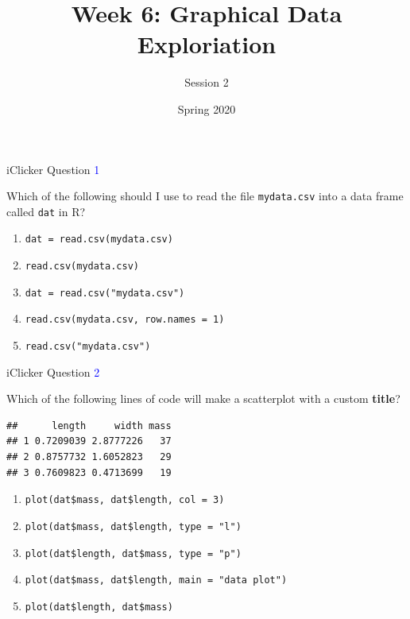 \documentclass[ignorenonframetext,t]{beamer}
\title{Week 6: Graphical Data Exploriation}
\subtitle{Session 2}
\date{Spring 2020}
\begin{document}
\frame{\titlepage}

\begin{frame}[fragile]{iClicker Question \textcolor{blue}{1}}

Which of the following should I use to read the file \texttt{mydata.csv}
into a data frame called \texttt{dat} in R?

\begin{enumerate}[A]
\item \texttt{dat = read.csv(mydata.csv)}
\item \texttt{read.csv(mydata.csv)}
\item \texttt{dat = read.csv("mydata.csv")}
\item \texttt{read.csv(mydata.csv, row.names = 1)}
\item \texttt{read.csv("mydata.csv")}
\end{enumerate}

\vfill


\end{frame}

\begin{frame}[fragile]{iClicker Question \textcolor{blue}{2}}

Which of the following lines of code will make a scatterplot with a
custom \textbf{title}?

\begin{verbatim}
##      length     width mass
## 1 0.7209039 2.8777226   37
## 2 0.8757732 1.6052823   29
## 3 0.7609823 0.4713699   19
\end{verbatim}

\begin{enumerate}[A]
\item \texttt{plot(dat\$mass, dat\$length, col = 3)}
\item \texttt{plot(dat\$mass, dat\$length, type = "l")}
\item \texttt{plot(dat\$length, dat\$mass, type = "p")}
\item \texttt{plot(dat\$mass, dat\$length, main = "data plot")}
\item \texttt{plot(dat\$length, dat\$mass)}
\end{enumerate}

\vfill


\end{frame}
\end{document}
